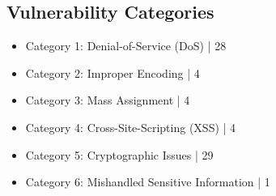 \documentclass[12pt]{article}
\begin{document}
\subsection{Vulnerability Categories}
\begin{itemize}
\item Category 1: Denial-of-Service (DoS) | 28
\item Category 2: Improper Encoding | 4
\item Category 3: Mass Assignment | 4
\item Category 4: Cross-Site-Scripting (XSS) | 4
\item Category 5: Cryptographic Issues | 29
\item Category 6: Mishandled Sensitive Information | 1

\end{itemize}
\end{document}
